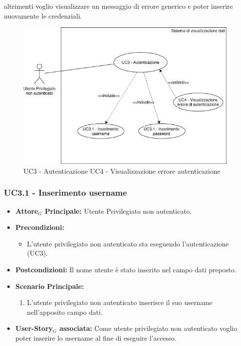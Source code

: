 \documentclass[11pt]{article}
\begin{document}
\begin{justify}
\begin{itemize}
     altrimenti voglio visualizzare un messaggio di errore generico e poter inserire nuovamente le credenziali.
\end{itemize}
\begin{figure}[H]
    \centering
    \includegraphics[width=0.7\linewidth]{UC3.12_UC4image.png}
    \caption{UC3 - Autenticazione\newline
    UC4 - Visualizzazione errore autenticazione}
    \label{fig:UC3 e UC4}
\end{figure}
\subsubsection{\textbf{UC3.1 - Inserimento username}}
\begin{itemize}
     \item \textbf{Attore$_G$ Principale:} Utente Privilegiato non autenticato.
     \item \textbf{Precondizioni:} 
            \begin{itemize}
                \item L'utente privilegiato non autenticato sta eseguendo l'autenticazione (UC3).
            \end{itemize}
     \item \textbf{Postcondizioni:} Il nome utente è stato inserito nel campo dati preposto.
     \item \textbf{Scenario Principale:}
        \begin{enumerate}
            \item L'utente privilegiato non autenticato inserisce il suo username nell'apposito campo dati.
        \end{enumerate}
     \item \textbf{User-Story$_G$ associata:} Come utente privilegiato non autenticato  voglio poter inserire lo username al fine di eseguire l'accesso.
\end{itemize}

\end{justify}
\end{document}
